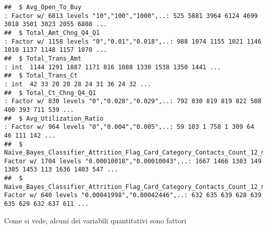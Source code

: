 \documentclass[
]{article}
\begin{document}
\begin{verbatim}
##  $ Avg_Open_To_Buy                                                                                                                   : Factor w/ 6813 levels "10","100","1000",..: 525 5881 3964 6124 4699 3018 3501 3023 2055 6808 ...
##  $ Total_Amt_Chng_Q4_Q1                                                                                                              : Factor w/ 1158 levels "0","0.01","0.018",..: 988 1074 1155 1021 1146 1010 1137 1148 1157 1070 ...
##  $ Total_Trans_Amt                                                                                                                   : int  1144 1291 1887 1171 816 1088 1330 1538 1350 1441 ...
##  $ Total_Trans_Ct                                                                                                                    : int  42 33 20 20 28 24 31 36 24 32 ...
##  $ Total_Ct_Chng_Q4_Q1                                                                                                               : Factor w/ 830 levels "0","0.028","0.029",..: 792 830 819 819 822 508 400 393 711 539 ...
##  $ Avg_Utilization_Ratio                                                                                                             : Factor w/ 964 levels "0","0.004","0.005",..: 59 103 1 758 1 309 64 46 111 142 ...
##  $ Naive_Bayes_Classifier_Attrition_Flag_Card_Category_Contacts_Count_12_mon_Dependent_count_Education_Level_Months_Inactive_12_mon_1: Factor w/ 1704 levels "0.00010018","0.00010043",..: 1667 1466 1303 149 1305 1453 113 1636 1403 547 ...
##  $ Naive_Bayes_Classifier_Attrition_Flag_Card_Category_Contacts_Count_12_mon_Dependent_count_Education_Level_Months_Inactive_12_mon_2: Factor w/ 640 levels "0.00041998","0.00042446",..: 632 635 639 628 639 635 629 632 637 611 ...
\end{verbatim}

Come si vede, alcuni dei variabili quantitativi sono fattori
\end{document}
